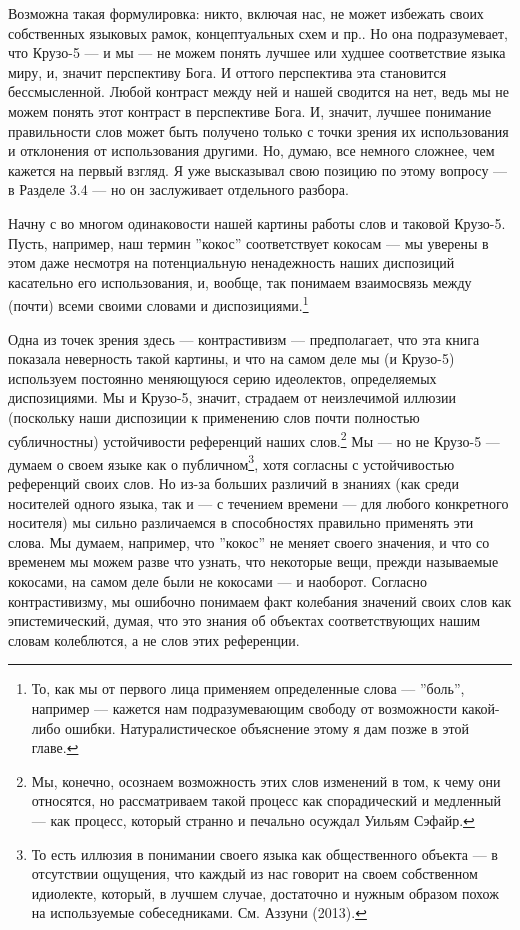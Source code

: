 \documentclass[11pt]{book}
\begin{document}
Возможна такая формулировка: никто, включая нас, не может избежать своих собственных языковых рамок, концептуальных схем и пр.. Но она подразумевает, что Крузо-5 --- и мы --- не можем понять лучшее или худшее соответствие языка миру, и, значит перспективу Бога. И оттого перспектива эта становится бессмысленной. Любой контраст между ней и нашей сводится на нет, ведь мы не можем понять этот контраст в перспективе Бога. И, значит, лучшее понимание правильности слов может быть получено только с точки зрения их использования и отклонения от использования другими. Но, думаю, все немного сложнее, чем кажется на первый взгляд. Я уже высказывал свою позицию по этому вопросу --- в Разделе 3.4 --- но он заслуживает отдельного разбора.

Начну с во многом одинаковости нашей картины работы слов и таковой Крузо-5. Пусть, например, наш термин ''кокос'' соответствует кокосам --- мы уверены в этом даже несмотря на потенциальную ненадежность наших диспозиций касательно его использования, и, вообще, так понимаем взаимосвязь между (почти) всеми своими словами и диспозициями.\footnote{То, как мы от первого лица применяем определенные слова --- ''боль'', например --- кажется нам подразумевающим свободу от возможности какой-либо ошибки. Натуралистическое объяснение этому я дам позже в этой главе.}

Одна из точек зрения здесь --- контрастивизм --- предполагает, что эта книга показала неверность такой картины, и что на самом деле мы (и Крузо-5) используем постоянно меняющуюся серию идеолектов, определяемых диспозициями. Мы и Крузо-5, значит, страдаем от неизлечимой иллюзии (поскольку наши диспозиции к применению слов почти полностью субличностны) устойчивости референций наших слов.\footnote{Мы, конечно, осознаем возможность этих слов изменений в том, к чему они относятся, но рассматриваем такой процесс как спорадический и медленный --- как процесс, который странно и печально осуждал Уильям Сэфайр.} Мы --- но не Крузо-5 --- думаем о своем языке как о публичном\footnote{То есть иллюзия в понимании своего языка как общественного объекта --- в отсутствии ощущения, что каждый из нас говорит на своем собственном идиолекте, который, в лучшем случае, достаточно и нужным образом похож на используемые собеседниками. См. Аззуни (2013).}, хотя согласны с устойчивостью референций своих слов. Но из-за больших различий в знаниях (как среди носителей одного языка, так и --- с течением времени --- для любого конкретного носителя) мы сильно различаемся в способностях правильно применять эти слова. Мы думаем, например, что ''кокос'' не меняет своего значения, и что со временем мы можем разве что узнать, что некоторые вещи, прежди называемые кокосами, на самом деле были не кокосами --- и наоборот. Согласно контрастивизму, мы ошибочно понимаем факт колебания значений своих слов как эпистемический, думая, что это знания об объектах соответствующих нашим словам колеблются, а не слов этих референции.
\end{document}
